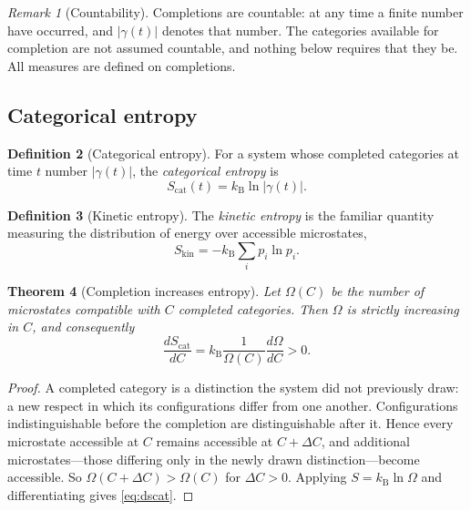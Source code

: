 \documentclass[11pt,twocolumn,a4paper]{article}
\theoremstyle{plain}
\newtheorem{theorem}{Theorem}[section]
\theoremstyle{definition}
\newtheorem{definition}[theorem]{Definition}
\theoremstyle{remark}
\newtheorem{remark}[theorem]{Remark}
\newcommand{\kB}{k_{\mathrm{B}}}
\newcommand{\Compl}{\gamma}
\newcommand{\Scat}{S_{\mathrm{cat}}}
\newcommand{\Skin}{S_{\mathrm{kin}}}
\begin{document}
\begin{remark}[Countability]
\label{rem:countability}
Completions are countable: at any time a finite number have occurred, and
$|\Compl(t)|$ denotes that number. The categories available for completion are
not assumed countable, and nothing below requires that they be. All measures are
defined on completions.
\end{remark}

\subsection{Categorical entropy}

\begin{definition}[Categorical entropy]
\label{def:scat}
For a system whose completed categories at time $t$ number $|\Compl(t)|$, the
\emph{categorical entropy} is
\begin{equation}
\Scat(t) = \kB \ln |\Compl(t)| .
\label{eq:scat}
\end{equation}
\end{definition}

\begin{definition}[Kinetic entropy]
\label{def:skin}
The \emph{kinetic entropy} is the familiar quantity measuring the distribution
of energy over accessible microstates,
\begin{equation}
\Skin = -\kB \sum_i p_i \ln p_i .
\label{eq:skin}
\end{equation}
\end{definition}

\begin{theorem}[Completion increases entropy]
\label{thm:completion-increases}
Let $\Omega(C)$ be the number of microstates compatible with $C$ completed
categories. Then $\Omega$ is strictly increasing in $C$, and consequently
\begin{equation}
\frac{d\Scat}{dC} = \kB \frac{1}{\Omega(C)}\frac{d\Omega}{dC} > 0 .
\label{eq:dscat}
\end{equation}
\end{theorem}

\begin{proof}
A completed category is a distinction the system did not previously draw: a new
respect in which its configurations differ from one another. Configurations
indistinguishable before the completion are distinguishable after it. Hence
every microstate accessible at $C$ remains accessible at $C+\Delta C$, and
additional microstates---those differing only in the newly drawn
distinction---become accessible. So $\Omega(C+\Delta C) > \Omega(C)$ for
$\Delta C > 0$. Applying $S = \kB\ln\Omega$ and differentiating gives
\cref{eq:dscat}.
\end{proof}
\end{document}
